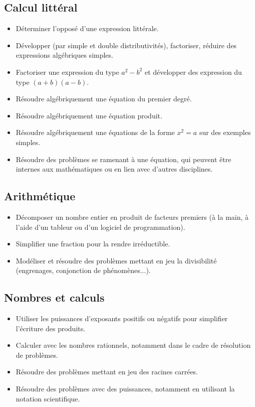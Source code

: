 \documentclass[a4paper,12pt,fleqn]{article}	
\begin{document}
\renewcommand{\labelitemi}{}

\subsection*{Calcul littéral}

\begin{itemize}
	\item {}Déterminer l’opposé d’une expression littérale.
	\item {}Développer (par simple et double distributivités), factoriser, réduire des expressions algébriques simples.
	\item {}Factoriser une expression du type $a^2-b^2$ et développer des expression du type $(a+b)(a-b)$.
	\item {}Résoudre algébriquement une équation du premier degré.
	\item {}Résoudre algébriquement une équation produit.
	\item {}Résoudre algébriquement une équations de la forme $x^2=a$ sur des exemples simples.
	\item {}Résoudre des problèmes se ramenant à une équation, qui peuvent être internes aux mathématiques ou en lien avec d’autres disciplines.

\end{itemize}

\subsection*{Arithmétique}

\begin{itemize}
	\item {}Décomposer un nombre entier en produit de facteurs premiers (à la main, à l’aide d’un tableur ou d’un logiciel de programmation).
	\item {}Simplifier une fraction pour la rendre irréductible.
	\item {}Modéliser et résoudre des problèmes mettant en jeu la divisibilité (engrenages, conjonction de phénomènes...).
\end{itemize}

\subsection*{Nombres et calculs}

\begin{itemize}
	\item {}Utiliser les puissances d’exposants positifs ou négatifs pour simplifier l’écriture des produits.
	\item {}Calculer avec les nombres rationnels, notamment dans le cadre de résolution de problèmes.
	\item {}Résoudre des problèmes mettant en jeu des racines carrées.
	\item {}Résoudre des problèmes avec des puissances, notamment en utilisant la notation scientifique.
\end{itemize}
	
\end{document}
